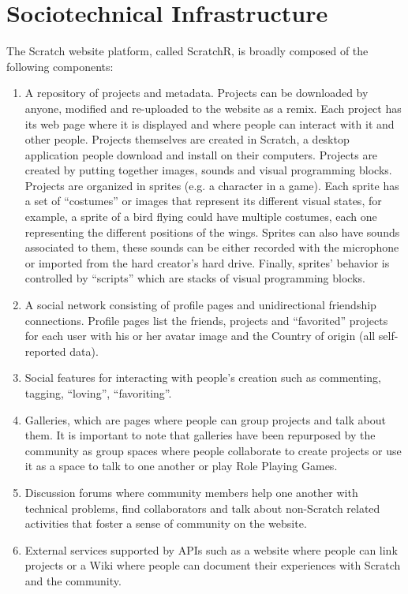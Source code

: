 \section{Sociotechnical Infrastructure}
The Scratch website platform, called ScratchR, is broadly composed of the following components: 

\begin{enumerate}
\item A repository of projects and metadata. Projects can be downloaded by anyone, modified and re-uploaded to the website as a remix. Each project has its web page where it is displayed and where people can interact with it and other people. Projects themselves are created in Scratch, a desktop application people download and install on their computers. Projects are created by putting together images, sounds and visual programming blocks. Projects are organized in sprites (e.g. a character in a game). Each sprite has a set of ``costumes'' or images that represent its different visual states, for example, a sprite of a bird flying could have multiple costumes, each one representing the different positions of the wings. Sprites can also have sounds associated to them, these sounds can be either recorded with the microphone or imported from the hard creator's hard drive. Finally, sprites' behavior is controlled by ``scripts'' which are stacks of visual programming blocks. 

\item A social network consisting of profile pages and unidirectional friendship connections. Profile pages list the friends, projects and ``favorited'' projects for each user with his or her avatar image and the Country of origin (all self-reported data).

\item Social features for interacting with people's creation such as commenting, tagging, ``loving'', ``favoriting''.

\item Galleries, which are pages where people can group projects and talk about them. It is important to note that galleries have been repurposed by the community as group spaces where people collaborate to create projects or use it as a space to talk to one another or play Role Playing Games.

\item Discussion forums where community members help one another with technical problems, find collaborators and talk about non-Scratch related activities that foster a sense of community on the website.

\item External services supported by APIs such as a website where people can link projects or a Wiki where people can document their experiences with Scratch and the community.
\end{enumerate}

